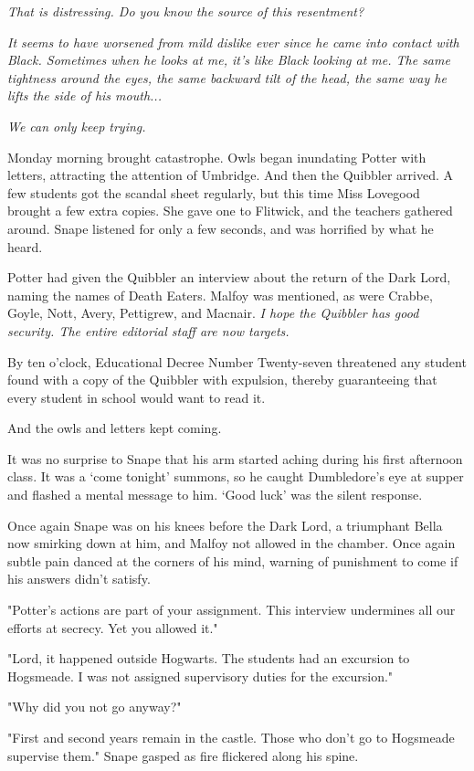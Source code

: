 \emph{That is distressing. Do you know the source of this resentment?}

\emph{It seems to have worsened from mild dislike ever since he came into contact with Black. Sometimes when he looks at me, it's like Black looking at me. The same tightness around the eyes, the same backward tilt of the head, the same way he lifts the side of his mouth...}

\emph{We can only keep trying.}

Monday morning brought catastrophe. Owls began inundating Potter with letters, attracting the attention of Umbridge. And then the Quibbler arrived. A few students got the scandal sheet regularly, but this time Miss Lovegood brought a few extra copies. She gave one to Flitwick, and the teachers gathered around. Snape listened for only a few seconds, and was horrified by what he heard.

Potter had given the Quibbler an interview about the return of the Dark Lord, naming the names of Death Eaters. Malfoy was mentioned, as were Crabbe, Goyle, Nott, Avery, Pettigrew, and Macnair. \emph{I hope the Quibbler has good security. The entire editorial staff are now targets.}

By ten o'clock, Educational Decree Number Twenty-seven threatened any student found with a copy of the Quibbler with expulsion, thereby guaranteeing that every student in school would want to read it.

And the owls and letters kept coming.

It was no surprise to Snape that his arm started aching during his first afternoon class. It was a `come tonight' summons, so he caught Dumbledore's eye at supper and flashed a mental message to him. `Good luck' was the silent response.

Once again Snape was on his knees before the Dark Lord, a triumphant Bella now smirking down at him, and Malfoy not allowed in the chamber. Once again subtle pain danced at the corners of his mind, warning of punishment to come if his answers didn't satisfy.

"Potter's actions are part of your assignment. This interview undermines all our efforts at secrecy. Yet you allowed it."

"Lord, it happened outside Hogwarts. The students had an excursion to Hogsmeade. I was not assigned supervisory duties for the excursion."

"Why did you not go anyway?"

"First and second years remain in the castle. Those who don't go to Hogsmeade supervise them." Snape gasped as fire flickered along his spine.

